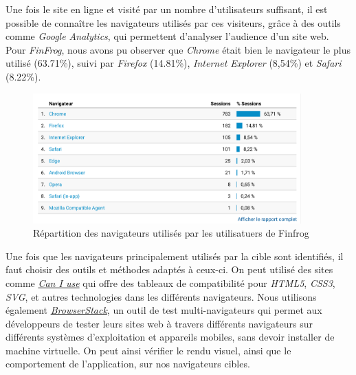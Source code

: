 \documentclass[12pt,a4paper]{article}
\begin{document}
  \bigskip

  Une fois le site en ligne et visité par un nombre d'utilisateurs
  suffisant, il est possible de connaître les navigateurs utilisés par ces
  visiteurs, grâce à des outils comme \emph{Google Analytics}, qui
  permettent d'analyser l'audience d'un site web. Pour \emph{FinFrog},
  nous avons pu observer que \emph{Chrome} était bien le navigateur le
  plus utilisé (63.71\%), suivi par \emph{Firefox} (14.81\%),
  \emph{Internet Explorer} (8,54\%) et \emph{Safari} (8.22\%).

  \begin{figure}[h]
    \centering
    \includegraphics[height=5cm]{figures/FF-browsers.png}
    \caption{Répartition des navigateurs utilisés par les utilisatuers de Finfrog}
  \end{figure}

  \bigskip

  Une fois que les navigateurs principalement utilisés par la cible sont
  identifiés, il faut choisir des outils et méthodes adaptés à ceux-ci. On
  peut utilisé des sites comme \href{http://caniuse.com/}{\emph{Can I
  use}} qui offre des tableaux de compatibilité pour \emph{HTML5},
  \emph{CSS3}, \emph{SVG}, et autres technologies dans les différents
  navigateurs. Nous utilisons également
  \href{https://www.browserstack.com/}{\emph{BrowserStack}}, un outil de
  test multi-navigateurs qui permet aux développeurs de tester leurs sites
  web à travers différents navigateurs sur différents systèmes
  d'exploitation et appareils mobiles, sans devoir installer de machine
  virtuelle. On peut ainsi vérifier le rendu visuel, ainsi que le
  comportement de l'application, sur nos navigateurs cibles.

  \bigskip
\end{document}
